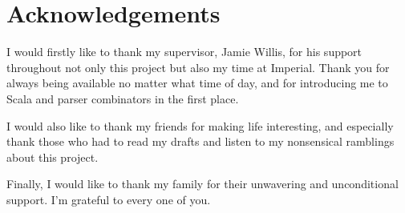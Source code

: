\documentclass[../../main.tex]{subfiles}
\begin{document}
\hspace{0pt}
\vfill
\section*{\centering Acknowledgements}
\noindent
I would firstly like to thank my supervisor, Jamie Willis, for his support throughout not only this project but also my time at Imperial.
Thank you for always being available no matter what time of day, and for introducing me to Scala and parser combinators in the first place.
\newline

\noindent
I would also like to thank my friends for making life interesting, and especially thank those who had to read my drafts and listen to my nonsensical ramblings about this project.
\newline

\noindent
Finally, I would like to thank my family for their unwavering and unconditional support.
I'm grateful to every one of you.
\vfill
\hspace{0pt}
\end{document}
